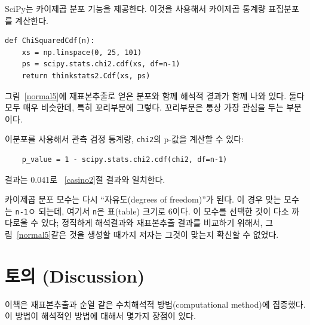 SciPy는 카이제곱 분포 기능을 제공한다. 이것을 사용해서 카이제곱 통계량 표집분포를 계산한다.

\begin{verbatim}
def ChiSquaredCdf(n):
    xs = np.linspace(0, 25, 101)
    ps = scipy.stats.chi2.cdf(xs, df=n-1)
    return thinkstats2.Cdf(xs, ps)
\end{verbatim}

그림~\ref{normal5}에 재표본추출로 얻은 분포와 함께 해석적 결과가 함께 나와 있다. 둘다 모두 매우 비슷한데, 특히 꼬리부분에 그렇다. 꼬리부분은 통상 가장 관심을 두는 부분이다.

이분포를 사용해서 관측 검정 통계량, {\tt chi2}의 p-값을 계산할 수 있다:

\begin{verbatim}
    p_value = 1 - scipy.stats.chi2.cdf(chi2, df=n-1)
\end{verbatim}

결과는 0.041로 ~\ref{casino2}절 결과와 일치한다.

카이제곱 분포 모수는 다시 ``자유도(degrees of freedom)''가 된다.
이 경우 맞는 모수는 {\tt n-1}ㅇ 되는데, 여기서 {\tt n}은 표(table) 크기로 6이다.
이 모수를 선택한 것이 다소 까다로울 수 있다; 정직하게 해석결과와 재표본추출 결과를 비교하기 위해서, 그림~\ref{normal5}같은 것을 생성할 때가지 저자는 그것이 맞는지 확신할 수 없었다.


\section{토의 (Discussion)}

이책은 재표본추출과 순열 같은 수치해석적 방법(computational method)에 집중했다. 이 방법이 해석적인 방법에 대해서 몇가지 장점이 있다.



